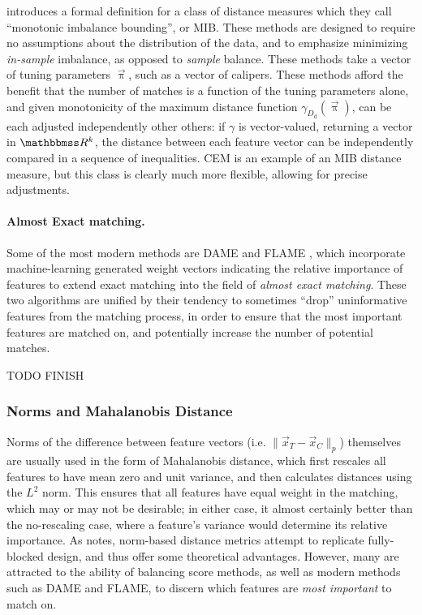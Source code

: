 \documentclass[11pt]{extarticle}
\begin{document}
\textcite{iacus_multivariate_2011} introduces a formal definition for a class of distance measures which they call ``monotonic imbalance bounding'', or MIB. These methods are designed to require no assumptions about the distribution of the data, and to emphasize minimizing \emph{in-sample} imbalance, as opposed to \emph{sample} balance. These methods take a vector of tuning parameters $\vec{\uppi}$, such as a vector of calipers. These methods afford the benefit that the number of matches is a function of the tuning parameters alone, and given monotonicity of the maximum distance function $\gamma_{D_{d}}(\vec{\uppi})$, can be each adjusted independently other others: if $\gamma$ is vector-valued, returning a vector in $\reals^k$, the distance between each feature vector can be independently compared in a sequence of inequalities. CEM is an example of an MIB distance measure, but this class is clearly much more flexible, allowing for precise adjustments.

\paragraph{Almost Exact matching.} Some of the most modern methods are DAME \parencite{liu_interpretable_2019} and FLAME \cite{wang_flame_2021}, which incorporate machine-learning generated weight vectors indicating the relative importance of features to extend exact matching into the field of \emph{almost exact matching}. These two algorithms are unified by their tendency to sometimes ``drop'' uninformative features from the matching process, in order to ensure that the most important features are matched on, and potentially increase the number of potential matches.

TODO FINISH

\subsubsection{Norms and Mahalanobis Distance}
\label{subsubsec:normdist}

Norms of the difference between feature vectors (i.e. $\| \vec{x}_T - \vec{x}_C \|_p$) themselves are usually used in the form of Mahalanobis distance, which first rescales all features to have mean zero and unit variance, and then calculates distances using the $L^2$ norm.
This ensures that all features have equal weight in the matching, which may or may not be desirable; in either case, it almost certainly better than the no-rescaling case, where a feature's variance would determine its relative importance.
As \textcite{king_why_2019} notes, norm-based distance metrics attempt to replicate fully-blocked design, and thus offer some theoretical advantages.
However, many are attracted to the ability of balancing score methods, as well as modern methods such as DAME and FLAME, to discern which features are \emph{most important} to match on. 
\end{document}
